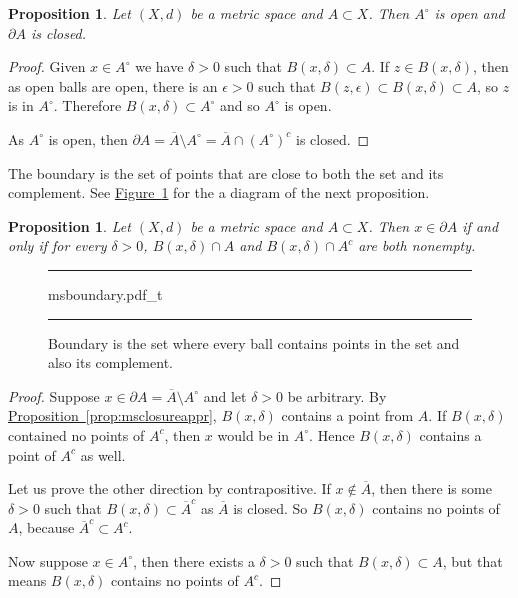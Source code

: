 \documentclass[12pt]{book}
\newenvironment{myfigureht}{%
\begin{figure}[h!t]
\noindent\rule{\textwidth}{0.4pt}\vspace{12pt}\par\centering}%
{\par\noindent\rule{\textwidth}{0.4pt}
\end{figure}}
\theoremstyle{plain}
\newtheorem{prop}[thm]{Proposition}
\theoremstyle{remark}
\theoremstyle{definition}
\theoremstyle{exercise}
\theoremstyle{example}
\newcommand{\figureref}[1]{\hyperref[#1]{Figure~\ref*{#1}}}
\newcommand{\propref}[1]{\hyperref[#1]{Proposition~\ref*{#1}}}
\begin{document}
\begin{prop}
Let $(X,d)$ be a metric space and $A \subset X$.  Then $A^\circ$ is open
and $\partial A$ is closed.
\end{prop}

\begin{proof}
Given $x \in A^\circ$ we have $\delta > 0$ such that $B(x,\delta)
\subset A$.  If $z \in B(x,\delta)$, then as open balls are open,
there is an $\epsilon > 0$ such that $B(z,\epsilon) \subset B(x,\delta)
\subset A$, so $z$ is in $A^\circ$.  Therefore $B(x,\delta) \subset
A^\circ$ and so $A^\circ$ is open.

As $A^\circ$ is open, then
$\partial A = \overline{A} \setminus A^\circ = \overline{A} \cap
{(A^\circ)}^c$ is closed.
\end{proof}

The boundary is the set of points that are close to both the set and its
complement.  See \figureref{figmsboundary} for the a diagram
of the next proposition.

\begin{prop}
Let $(X,d)$ be a metric space and $A \subset X$.  Then $x \in \partial A$
if and only if for every $\delta > 0$,
$B(x,\delta) \cap A$ and
$B(x,\delta) \cap A^c$ are both nonempty.
\end{prop}

\begin{myfigureht}
{msboundary.pdf_t}
\caption{Boundary is the set where every ball contains points in the set and
also its complement.\label{figmsboundary}}
\end{myfigureht}

\begin{proof}
Suppose $x \in \partial A =  \overline{A} \setminus A^\circ$ and
let $\delta > 0$ be arbitrary.
By \propref{prop:msclosureappr}, $B(x,\delta)$ contains
a point from $A$.  If $B(x,\delta)$ contained no points of $A^c$,
then $x$ would be in $A^\circ$.  Hence $B(x,\delta)$ contains a point of
$A^c$ as well.

Let us prove the other direction by contrapositive.
If $x \notin \overline{A}$, then there is some $\delta > 0$ such that
$B(x,\delta) \subset \overline{A}^c$ as $\overline{A}$ is closed.
So $B(x,\delta)$ contains no points of $A$, because $\overline{A}^c \subset
A^c$.

Now suppose $x \in A^\circ$, then there exists a $\delta > 0$
such that $B(x,\delta) \subset A$, but that means $B(x,\delta)$
contains no points of $A^c$.
\end{proof}
\end{document}
